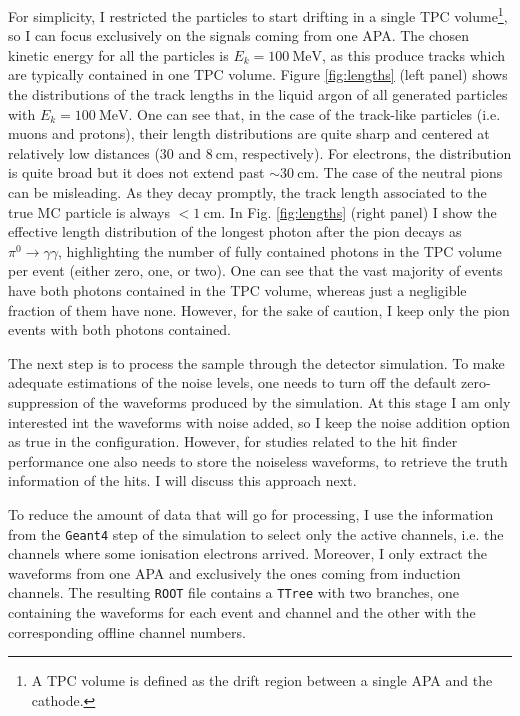 For simplicity, I restricted the particles to start drifting in a single TPC volume\footnote{A TPC volume is defined as the drift region between a single APA and the cathode.}, so I can focus exclusively on the signals coming from one APA. The chosen kinetic energy for all the particles is $E_{k} = 100 \ \mathrm{MeV}$, as this produce tracks which are typically contained in one TPC volume. Figure \ref{fig:lengths} (left panel) shows the distributions of the track lengths in the liquid argon of all generated particles with $E_{k} = 100 \ \mathrm{MeV}$. One can see that, in the case of the track-like particles (i.e. muons and protons), their length distributions are quite sharp and centered at relatively low distances ($30$ and $8 \ \mathrm{cm}$, respectively). For electrons, the distribution is quite broad but it does not extend past $\sim 30 \ \mathrm{cm}$. The case of the neutral pions can be misleading. As they decay promptly, the track length associated to the true MC particle is always $< 1 \ \mathrm{cm}$. In Fig. \ref{fig:lengths} (right panel) I show the effective length distribution of the longest photon after the pion decays as $\pi^{0} \rightarrow \gamma \gamma$, highlighting the number of fully contained photons in the TPC volume per event (either zero, one, or two). One can see that the vast majority of events have both photons contained in the TPC volume, whereas just a negligible fraction of them have none. However, for the sake of caution, I keep only the pion events with both photons contained.

The next step is to process the sample through the detector simulation. To make adequate estimations of the noise levels, one needs to turn off the default zero-suppression of the waveforms produced by the simulation. At this stage I am only interested int the waveforms with noise added, so I keep the noise addition option as true in the configuration. However, for studies related to the hit finder performance one also needs to store the noiseless waveforms, to retrieve the truth information of the hits. I will discuss this approach next.

To reduce the amount of data that will go for processing, I use the information from the \texttt{Geant4} step of the simulation to select only the active channels, i.e. the channels where some ionisation electrons arrived. Moreover, I only extract the waveforms from one APA and exclusively the ones coming from induction channels. The resulting \texttt{ROOT} file contains a \texttt{TTree} with two branches, one containing the waveforms for each event and channel and the other with the corresponding offline channel numbers.

